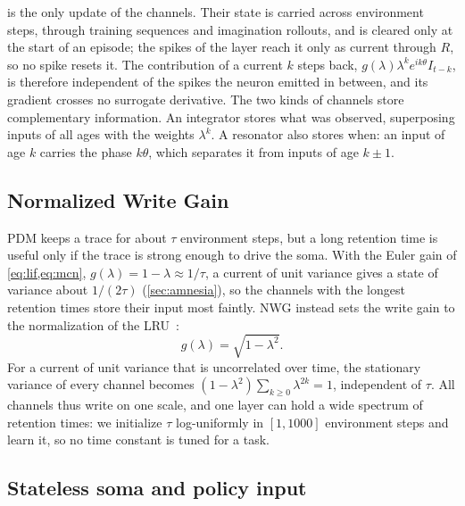 is the only update of the channels.
Their state is carried across environment steps, through training sequences and imagination rollouts, and is cleared only at the start of an episode; the spikes of the layer reach it only as current through $R$, so no spike resets it.
The contribution of a current $k$ steps back, $g(\lambda)\lambda^{k}e^{ik\theta}I_{t-k}$, is therefore independent of the spikes the neuron emitted in between, and its gradient crosses no surrogate derivative.
The two kinds of channels store complementary information.
An integrator stores what was observed, superposing inputs of all ages with the weights $\lambda^{k}$.
A resonator also stores when: an input of age $k$ carries the phase $k\theta$, which separates it from inputs of age $k\pm1$.

\subsection{Normalized Write Gain}
\label{sec:nwg}

PDM keeps a trace for about $\tau$ environment steps, but a long retention time is useful only if the trace is strong enough to drive the soma.
With the Euler gain of \cref{eq:lif,eq:mcn}, $g(\lambda)=1-\lambda\approx1/\tau$, a current of unit variance gives a state of variance about $1/(2\tau)$ (\cref{sec:amnesia}), so the channels with the longest retention times store their input most faintly.
NWG instead sets the write gain to the normalization of the LRU~\cite{orvieto2023lru}:
\begin{equation}
g(\lambda)=\sqrt{1-\lambda^2}.
\label{eq:nwg}
\end{equation}
For a current of unit variance that is uncorrelated over time, the stationary variance of every channel becomes $(1-\lambda^2)\sum_{k\ge0}\lambda^{2k}=1$, independent of $\tau$.
All channels thus write on one scale, and one layer can hold a wide spectrum of retention times: we initialize $\tau$ log-uniformly in $[1,1000]$ environment steps and learn it, so no time constant is tuned for a task.

\subsection{Stateless soma and policy input}
\label{sec:soma}

